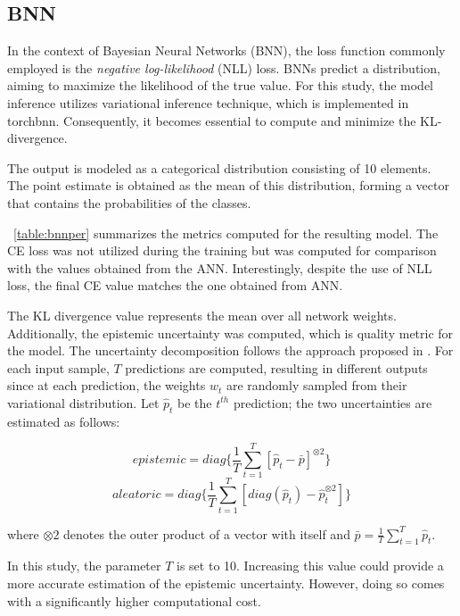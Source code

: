 \subsection{BNN}

In the context of Bayesian Neural Networks (BNN), the loss function commonly employed is the \textit{negative log-likelihood} (NLL) loss. BNNs predict a distribution, aiming to maximize the likelihood of the true value. For this study, the model inference utilizes variational inference technique, which is implemented in torchbnn. Consequently, it becomes essential to compute and minimize the KL-divergence.

The output is modeled as a categorical distribution consisting of 10 elements. The point estimate is obtained as the mean of this distribution, forming a vector that contains the probabilities of the classes.

\Tab~\ref{table:bnnper} summarizes the metrics computed for the resulting model. The CE loss was not utilized during the training but was computed for comparison with the values obtained from the ANN. Interestingly, despite the use of NLL loss, the final CE value matches the one obtained from ANN.

The KL divergence value represents the mean over all network weights. Additionally, the epistemic uncertainty was computed, which is quality metric for the model. The uncertainty decomposition follows the approach proposed in \cite{KWON2020106816}. For each input sample, $T$ predictions are computed, resulting in different outputs since at each prediction, the weights $w_t$ are randomly sampled from their variational distribution. Let $\hat{p}_t$ be the $t^{th}$ prediction; the two uncertainties are estimated as follows:

\begin{equation}
	epistemic = diag\{\frac{1}{T} \sum_{t=1}^{T} [\hat{p}_t - \bar{p}]^{\otimes 2}\}
\end{equation}
\begin{equation}
	aleatoric = diag\{\frac{1}{T} \sum_{t=1}^{T} [diag(\hat{p}_t) - \hat{p}_t^{\otimes 2}]\}
\end{equation}

where $\otimes 2$ denotes the outer product of a vector with itself and $\bar{p} = \frac{1}{T} \sum_{t=1}^{T} \hat{p}_t$.

In this study, the parameter $T$ is set to 10. Increasing this value could provide a more accurate estimation of the epistemic uncertainty. However, doing so comes with a significantly higher computational cost.

